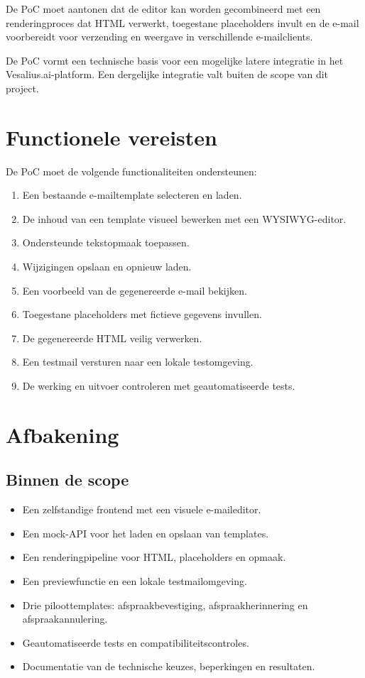 De PoC moet aantonen dat de editor kan worden gecombineerd met een
renderingproces dat HTML verwerkt, toegestane placeholders invult en de
e-mail voorbereidt voor verzending en weergave in verschillende
e-mailclients.

De PoC vormt een technische basis voor een mogelijke latere integratie in
het Vesalius.ai-platform. Een dergelijke integratie valt buiten de scope
van dit project.

\section{Functionele vereisten}
De PoC moet de volgende functionaliteiten ondersteunen:

\begin{enumerate}
    \item Een bestaande e-mailtemplate selecteren en laden.
    \item De inhoud van een template visueel bewerken met een WYSIWYG-editor.
    \item Ondersteunde tekstopmaak toepassen.
    \item Wijzigingen opslaan en opnieuw laden.
    \item Een voorbeeld van de gegenereerde e-mail bekijken.
    \item Toegestane placeholders met fictieve gegevens invullen.
    \item De gegenereerde HTML veilig verwerken.
    \item Een testmail versturen naar een lokale testomgeving.
    \item De werking en uitvoer controleren met geautomatiseerde tests.
\end{enumerate}

\section{Afbakening}

\subsection{Binnen de scope}

\begin{itemize}
    \item Een zelfstandige frontend met een visuele e-maileditor.
    \item Een mock-API voor het laden en opslaan van templates.
    \item Een renderingpipeline voor HTML, placeholders en opmaak.
    \item Een previewfunctie en een lokale testmailomgeving.
    \item Drie piloottemplates: afspraakbevestiging, afspraakherinnering en
    afspraakannulering.
    \item Geautomatiseerde tests en compatibiliteitscontroles.
    \item Documentatie van de technische keuzes, beperkingen en resultaten.
\end{itemize}

